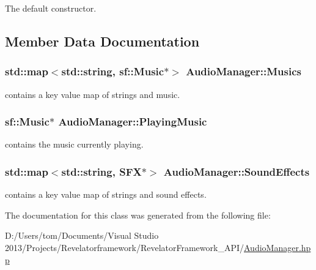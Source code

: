 The default constructor. 



\subsection{Member Data Documentation}
\hypertarget{class_audio_manager_af4fd3dd64a38f93f808955a626982cc2}{
\subsubsection[{Musics}]{\setlength{\rightskip}{0pt plus 5cm}std\-::map$<$std\-::string, sf\-::\-Music$\ast$$>$ Audio\-Manager\-::\-Musics\hspace{0.3cm}{\ttfamily [private]}}}\label{class_audio_manager_af4fd3dd64a38f93f808955a626982cc2}


contains a key value map of strings and music. 

\hypertarget{class_audio_manager_a8309e75d7e8ac5ecf53d5d8e787d8dc8}{
\subsubsection[{Playing\-Music}]{\setlength{\rightskip}{0pt plus 5cm}sf\-::\-Music$\ast$ Audio\-Manager\-::\-Playing\-Music\hspace{0.3cm}{\ttfamily [private]}}}\label{class_audio_manager_a8309e75d7e8ac5ecf53d5d8e787d8dc8}


contains the music currently playing. 

\hypertarget{class_audio_manager_a3dcd808b32f86411be40485188f6a917}{
\subsubsection[{Sound\-Effects}]{\setlength{\rightskip}{0pt plus 5cm}std\-::map$<$std\-::string, {\bf S\-F\-X}$\ast$$>$ Audio\-Manager\-::\-Sound\-Effects\hspace{0.3cm}{\ttfamily [private]}}}\label{class_audio_manager_a3dcd808b32f86411be40485188f6a917}


contains a key value map of strings and sound effects. 



The documentation for this class was generated from the following file\-:\begin{DoxyCompactItemize}
\item 
D\-:/\-Users/tom/\-Documents/\-Visual Studio 2013/\-Projects/\-Revelatorframework/\-Revelator\-Framework\-\_\-\-A\-P\-I/\hyperlink{_audio_manager_8hpp}{Audio\-Manager.\-hpp}\end{DoxyCompactItemize}
